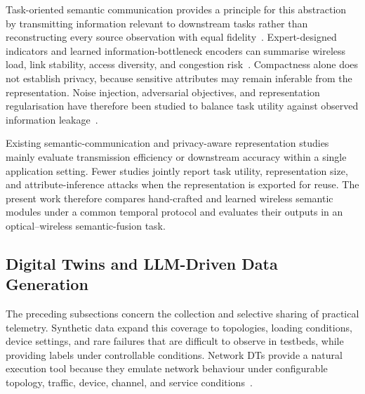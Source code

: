 \documentclass[9pt,twocolumn,twoside]{osajnl}
\begin{document}
Task-oriented semantic communication provides a principle for this abstraction by transmitting information relevant to downstream tasks rather than reconstructing every source observation with equal fidelity~\cite{xie2022task,ma2023explainable}. Expert-designed indicators and learned information-bottleneck encoders can summarise wireless load, link stability, access diversity, and congestion risk~\cite{alemi2017vib}. Compactness alone does not establish privacy, because sensitive attributes may remain inferable from the representation. Noise injection, adversarial objectives, and representation regularisation have therefore been studied to balance task utility against observed information leakage~\cite{alemi2017vib,edwards2016censor,madras2018fair,wang2024privacysemantic}.

Existing semantic-communication and privacy-aware representation studies mainly evaluate transmission efficiency or downstream accuracy within a single application setting. Fewer studies jointly report task utility, representation size, and attribute-inference attacks when the representation is exported for reuse. The present work therefore compares hand-crafted and learned wireless semantic modules under a common temporal protocol and evaluates their outputs in an optical--wireless semantic-fusion task.

\subsection{Digital Twins and LLM-Driven Data Generation}

The preceding subsections concern the collection and selective sharing of practical telemetry. Synthetic data expand this coverage to topologies, loading conditions, device settings, and rare failures that are difficult to observe in testbeds, while providing labels under controllable conditions. Network DTs provide a natural execution tool because they emulate network behaviour under configurable topology, traffic, device, channel, and service conditions~\cite{zhuge2023dt}.
\end{document}
